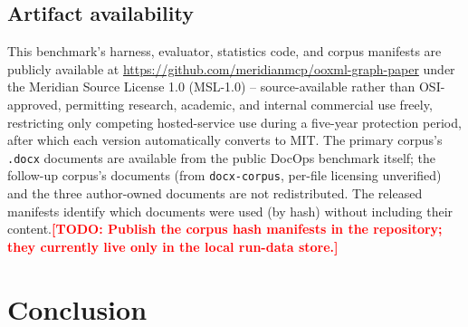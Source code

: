 \documentclass[11pt]{article}
\DeclareRobustCommand{\claim}[2]{#2}
\newcommand{\todo}[1]{\textcolor{red}{\textbf{[TODO: #1]}}}
\begin{document}
\subsection{Artifact availability}
This benchmark's harness, evaluator, statistics code, and corpus manifests are publicly available
at \url{https://github.com/meridianmcp/ooxml-graph-paper} under the Meridian Source License 1.0
(MSL-1.0) -- source-available rather than OSI-approved, permitting research, academic, and
internal commercial use freely, restricting only competing hosted-service use during a five-year
protection period, after which each version automatically converts to MIT. \claim{licensed-docops-corpus}{The primary corpus's
\texttt{.docx} documents are available from the public DocOps benchmark itself;} the follow-up
corpus's documents (from \texttt{docx-corpus}, per-file licensing unverified) and the three
author-owned documents are not redistributed. The released manifests identify which documents
were used (by hash) without including their content.\todo{Publish the corpus hash manifests in
the repository; they currently live only in the local run-data store.}

\section{Conclusion}
\label{sec:conclusion}
\end{document}

